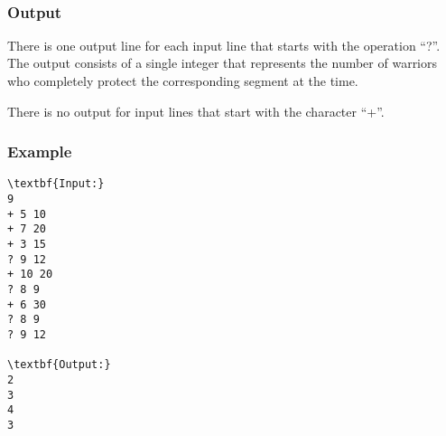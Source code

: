 \\

\subsubsection{   Output  }

    There is one output line for each input line that starts with the operation “?”. The output consists of a single integer that represents the number of warriors who completely protect the corresponding segment at the time.   

     There is no output for input lines that start with the character “+”.    

\subsubsection{   Example  }
\begin{verbatim}
\textbf{Input:}
9
+ 5 10
+ 7 20
+ 3 15
? 9 12
+ 10 20
? 8 9
+ 6 30
? 8 9
? 9 12

\textbf{Output:}
2
3
4
3\end{verbatim}